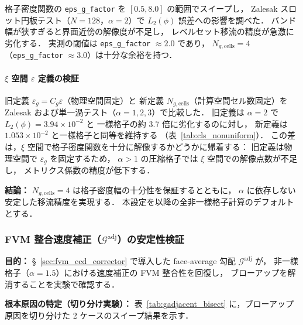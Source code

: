 格子密度関数の \texttt{eps\_g\_factor} を $[0.5, 8.0]$ の範囲でスイープし，
Zalesak スロット円板テスト（$N = 128$，$\alpha = 2$）で
$L_2(\phi)$ 誤差への影響を調べた．
バンド幅が狭すぎると界面近傍の解像度が不足し，
レベルセット移流の精度が急激に劣化する．
実測の閾値は \texttt{eps\_g\_factor} $\approx 2.0$ であり，
$N_{g,\text{cells}} = 4$（\texttt{eps\_g\_factor} $\approx 3.0$）は十分な余裕を持つ．

\paragraph{$\xi$ 空間 $\varepsilon$ 定義の検証}

旧定義 $\varepsilon_g = C_g \varepsilon$（物理空間固定）と
新定義 $N_{g,\text{cells}}$（計算空間セル数固定）を
Zalesak および単一渦テスト（$\alpha = 1, 2, 3$）で比較した．
旧定義は $\alpha = 2$ で $L_2(\phi) = 3.94 \times 10^{-2}$ と
一様格子の約 3.7 倍に劣化するのに対し，
新定義は $1.053 \times 10^{-2}$ と一様格子と同等を維持する
（表~\ref{tab:cls_nonuniform}）．
この差は，$\xi$ 空間で格子密度関数を十分に解像するかどうかに帰着する：
旧定義は物理空間で $\varepsilon_g$ を固定するため，
$\alpha > 1$ の圧縮格子では $\xi$ 空間での解像点数が不足し，
メトリクス係数の精度が低下する．

\noindent\textbf{結論：}
$N_{g,\text{cells}} = 4$ は格子密度幅の十分性を保証するとともに，
$\alpha$ に依存しない安定した移流精度を実現する．
本設定を以降の全非一様格子計算のデフォルトとする．


\subsubsection{\texorpdfstring{FVM 整合速度補正（$\mathcal{G}^\text{adj}$）の安定性検証}{FVM 整合速度補正（G\^{}adj）の安定性検証}}
\label{sec:gadjacent_verification}

\noindent\textbf{目的：}
§~\ref{sec:fvm_ccd_corrector} で導入した face-average 勾配 $\mathcal{G}^\text{adj}$ が，
非一様格子（$\alpha = 1.5$）における速度補正の FVM 整合性を回復し，
ブローアップを解消することを実験で確認する．

\noindent\textbf{根本原因の特定（切り分け実験）：}
表~\ref{tab:gadjacent_bisect} に，ブローアップ原因を切り分けた 2 ケースのスイープ結果を示す．

